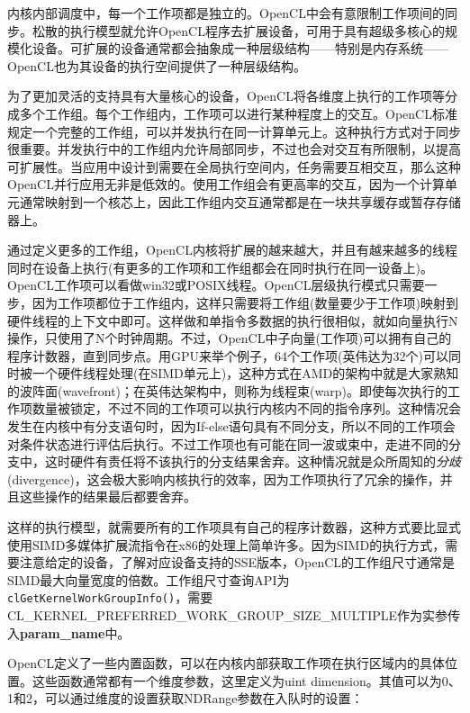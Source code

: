 内核内部调度中，每一个工作项都是独立的。OpenCL中会有意限制工作项间的同步。松散的执行模型就允许OpenCL程序去扩展设备，可用于具有超级多核心的规模化设备。可扩展的设备通常都会抽象成一种层级结构——特别是内存系统——OpenCL也为其设备的执行空间提供了一种层级结构。

为了更加灵活的支持具有大量核心的设备，OpenCL将各维度上执行的工作项等分成多个工作组。每个工作组内，工作项可以进行某种程度上的交互。OpenCL标准规定一个完整的工作组，可以并发执行在同一计算单元上。这种执行方式对于同步很重要。并发执行中的工作组内允许局部同步，不过也会对交互有所限制，以提高可扩展性。当应用中设计到需要在全局执行空间内，任务需要互相交互，那么这种OpenCL并行应用无非是低效的。使用工作组会有更高率的交互，因为一个计算单元通常映射到一个核芯上，因此工作组内交互通常都是在一块共享缓存或暂存存储器上。

通过定义更多的工作组，OpenCL内核将扩展的越来越大，并且有越来越多的线程同时在设备上执行(有更多的工作项和工作组都会在同时执行在同一设备上)。OpenCL工作项可以看做win32或POSIX线程。OpenCL层级执行模式只需要一步，因为工作项都位于工作组内，这样只需要将工作组(数量要少于工作项)映射到硬件线程的上下文中即可。这样做和单指令多数据的执行很相似，就如向量执行N操作，只使用了N个时钟周期。不过，OpenCL中子向量(工作项)可以拥有自己的程序计数器，直到同步点。用GPU来举个例子，64个工作项(英伟达为32个)可以同时被一个硬件线程处理(在SIMD单元上)，这种方式在AMD的架构中就是大家熟知的波阵面(wavefront)；在英伟达架构中，则称为线程束(warp)。即使每次执行的工作项数量被锁定，不过不同的工作项可以执行内核内不同的指令序列。这种情况会发生在内核中有分支语句时，因为If-else语句具有不同分支，所以不同的工作项会对条件状态进行评估后执行。不过工作项也有可能在同一波或束中，走进不同的分支中，这时硬件有责任将不该执行的分支结果舍弃。这种情况就是众所周知的\emph{分歧}(divergence)，这会极大影响内核执行的效率，因为工作项执行了冗余的操作，并且这些操作的结果最后都要舍弃。

这样的执行模型，就需要所有的工作项具有自己的程序计数器，这种方式要比显式使用SIMD多媒体扩展流指令在x86的处理上简单许多。因为SIMD的执行方式，需要注意给定的设备，了解对应设备支持的SSE版本，OpenCL的工作组尺寸通常是SIMD最大向量宽度的倍数。工作组尺寸查询API为\texttt{clGetKernelWorkGroupInfo()}，需要CL\_\allowbreak{}KERNEL\_\allowbreak{}PREFERRED\_\allowbreak{}WORK\_\allowbreak{}GROUP\_\allowbreak{}SIZE\_\allowbreak{}MULTIPLE作为实参传入\textbf{param\_\allowbreak{}name}中。

OpenCL定义了一些内置函数，可以在内核内部获取工作项在执行区域内的具体位置。这些函数通常都有一个维度参数，这里定义为uint dimension。其值可以为0、1和2，可以通过维度的设置获取NDRange参数在入队时的设置：

